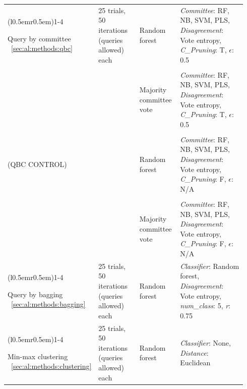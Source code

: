 \begin{longtable}{p{0.15\linewidth} p{0.21\linewidth} p{0.18\linewidth} 
p{0.4\linewidth}}
	\cmidrule[0.1pt](l{0.5em}r{0.5em}){1-4}
	
	Query by \newline committee ~\ref{sec:al:methods:qbc} & 
	25 trials, 50 iterations (queries allowed) each & 
	Random forest &	
	\textit{Committee}: RF, NB, SVM, PLS, \newline 
	\textit{Disagreement}: Vote entropy, \newline 
	\textit{C\_Pruning}: T, $\epsilon$: 0.5 \\ & \\
	
	& & Majority \newline committee \newline vote &	
	\textit{Committee}: RF, NB, SVM, PLS, \newline 
	\textit{Disagreement}: Vote entropy, \newline 
	\textit{C\_Pruning}: T, $\epsilon$: 0.5 \\ & \\
	
	(QBC \newline CONTROL) & & Random forest &	
	\textit{Committee}: RF, NB, SVM, PLS, \newline 
	\textit{Disagreement}: Vote entropy, \newline 
	\textit{C\_Pruning}: F, $\epsilon$: N/A \\ & \\
	
	& & Majority \newline committee \newline vote &	
	\textit{Committee}: RF, NB, SVM, PLS, \newline 
	\textit{Disagreement}: Vote entropy, \newline 
	\textit{C\_Pruning}: F, $\epsilon$: N/A \\	
	
	\cmidrule[0.1pt](l{0.5em}r{0.5em}){1-4}	
	
	Query by \newline bagging ~\ref{sec:al:methods:bagging} & 
	25 trials, 50 iterations (queries allowed) each & 
	Random forest &
	\textit{Classifier}: Random forest, \newline \textit{Disagreement}: Vote 
	entropy, \newline \textit{num\_class}: 5, \textit{r}: 0.75 \\
		
	\cmidrule[0.1pt](l{0.5em}r{0.5em}){1-4}	
	
	Min-max \newline clustering ~\ref{sec:al:methods:clustering} & 
	25 trials, 50 iterations (queries allowed) each & 
	Random forest & 
	\textit{Classifier}: None, \newline \textit{Distance}: Euclidean \\
	
\end{longtable}
\bodyspacing


